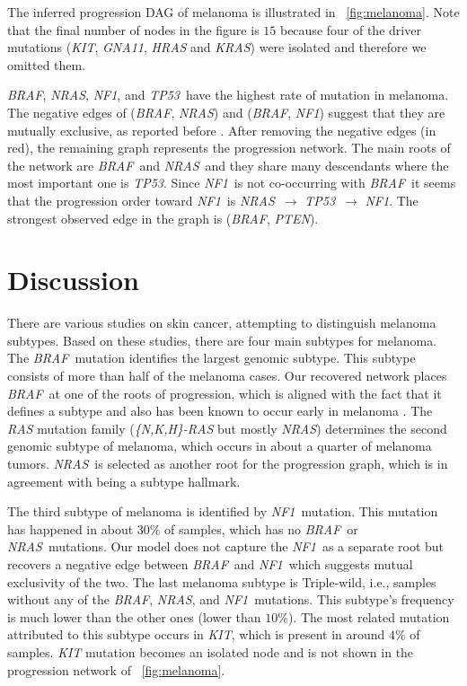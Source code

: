 \documentclass{bmcart}
\newcommand{\figref}[1]{\figurename~\ref{#1}}
\def\br{\textit{BRAF}}
\def\nr{\textit{NRAS}}
\def\tp{\textit{TP53}}
\def\nf{\textit{NF1}}
\begin{document}
The inferred progression DAG of melanoma is illustrated in \figref{fig:melanoma}. Note that the final number of nodes in the figure is $15$ because four of the driver mutations (\textit{KIT}, \textit{GNA11}, \textit{HRAS} and \textit{KRAS}) were isolated and therefore we omitted them.

\br, \nr, \nf, and \tp\ have the highest rate of mutation in melanoma. The negative edges of (\br, \nr) and (\br, \nf) suggest that they are mutually exclusive, as reported before \cite{akbani2015genomic}. After removing the negative edges (in red), the remaining graph represents the progression network. The main roots of the network are \br\ and \nr\, and they share many descendants where the most important one is \tp. Since \nf\ is not co-occurring with \br\, it seems that the progression order toward \nf\ is \nr\ $\rightarrow$ \tp\ $\rightarrow$ \nf. The strongest observed edge in the graph is (\br, \textit{PTEN}).


\section{Discussion}
There are various studies \cite{kunz2014oncogenes, akbani2015genomic, rajkumar2016molecular} on skin cancer, attempting to distinguish melanoma subtypes. Based on these studies, there are four main subtypes for melanoma. The \br\ mutation identifies the largest genomic subtype. This subtype consists of more than half of the melanoma cases. Our recovered network places \br\ at one of the roots of progression, which is aligned with the fact that it defines a subtype and also has been known to occur early in melanoma \cite{shain2015genetic}. The \textit{RAS} mutation family (\textit{\{N,K,H\}-RAS} but mostly \nr) determines the second genomic subtype of melanoma, which occurs in about a quarter of melanoma tumors. \nr\ is selected as another root for the progression graph, which is in agreement with being a subtype hallmark.

The third subtype of melanoma is identified by \nf\ mutation. This mutation has happened in about $30\%$ of samples, which has no \br\ or \nr\ mutations. Our model does not capture the \nf\ as a separate root but recovers a negative edge between \br\ and \nf\, which suggests mutual exclusivity of the two. The last melanoma subtype is Triple-wild, i.e., samples without any of the \br, \nr, and \nf\ mutations. This subtype's frequency is much lower than the other ones (lower than $10\%$). The most related mutation attributed to this subtype occurs in \textit{KIT}, which is present in around $4\%$ of samples. \textit{KIT} mutation becomes an isolated node and is not shown in the progression network of \figref{fig:melanoma}.
\end{document}
